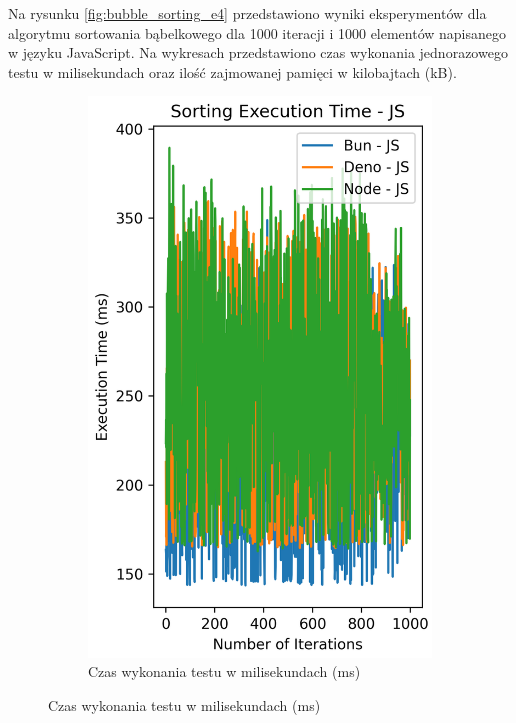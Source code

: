 Na rysunku \ref{fig:bubble_sorting_e4} przedstawiono wyniki eksperymentów dla algorytmu sortowania bąbelkowego dla 1000 iteracji i 1000 elementów napisanego w języku JavaScript. Na wykresach przedstawiono czas wykonania jednorazowego testu w milisekundach oraz ilość zajmowanej pamięci w kilobajtach (kB).

\begin{figure}[H]
  \centering
  \begin{subfigure}[b]{0.44\textwidth}
    \centering
    \includegraphics[width=\textwidth]{Figures/sorting/sorting_bubble_1000_10000_js_time.png}
    \caption{Czas wykonania testu w milisekundach (ms)}
    \label{fig:bubble_sorting_e4_time}

\end{subfigure}
\end{figure}
